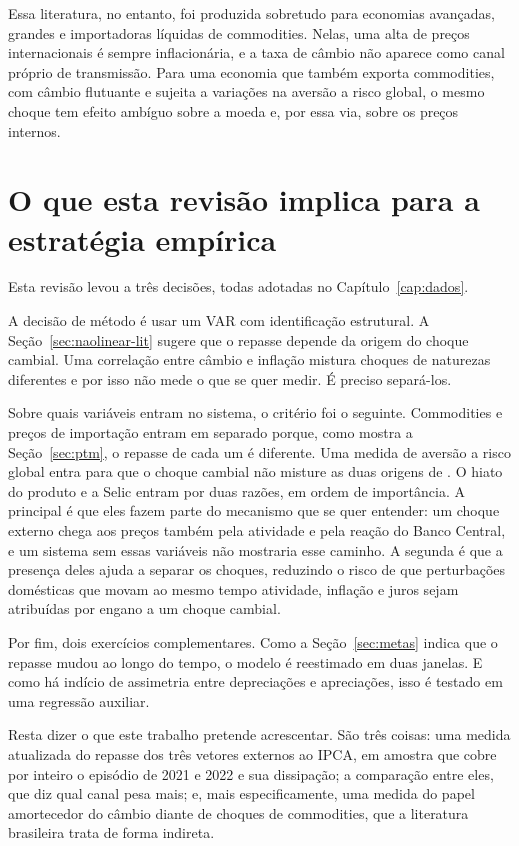 \documentclass[12pt,openright,oneside,a4paper,portuguese,brazil]{abntex2}
\begin{document}
Essa literatura, no entanto, foi produzida sobretudo para economias avançadas,
grandes e importadoras líquidas de commodities. Nelas, uma alta de preços internacionais é sempre inflacionária, e a taxa de
câmbio não aparece como canal próprio de transmissão. Para uma economia que também exporta
commodities, com câmbio flutuante e sujeita a variações na aversão a risco
global, o mesmo choque tem efeito ambíguo sobre a moeda e, por essa via, sobre
os preços internos.

\section{O que esta revisão implica para a estratégia empírica}
\label{sec:implicacoes}

Esta revisão levou a três decisões, todas adotadas no
Capítulo~\ref{cap:dados}.

A decisão de método é usar um VAR com identificação estrutural. A Seção~\ref{sec:naolinear-lit} sugere que o repasse depende da origem do
choque cambial. Uma correlação entre câmbio e inflação mistura choques de naturezas
diferentes e por isso não mede o que se quer medir. É preciso separá-los.

Sobre quais variáveis entram no sistema, o critério foi o seguinte. Commodities e preços de
importação entram em separado porque, como mostra a Seção~\ref{sec:ptm}, o
repasse de cada um é diferente. Uma medida de aversão a risco global entra para
que o choque cambial não misture as duas origens de . O hiato do produto e a Selic entram por duas razões, em ordem de importância.
A principal é que eles fazem parte do mecanismo que se quer entender: um
choque externo chega aos preços também pela atividade e pela reação do Banco
Central, e um sistema sem essas variáveis não mostraria esse caminho. A
segunda é que a presença deles ajuda a separar os choques, reduzindo o risco
de que perturbações domésticas que movam ao mesmo tempo atividade, inflação e
juros sejam atribuídas por engano a um choque cambial.

Por fim, dois exercícios complementares. Como a
Seção~\ref{sec:metas} indica que o repasse mudou ao longo do tempo, o modelo é
reestimado em duas janelas. E como há indício de assimetria entre depreciações e
apreciações, isso é testado em uma regressão auxiliar.

Resta dizer o que este trabalho pretende acrescentar. São três coisas: uma
medida atualizada do repasse dos três vetores externos ao IPCA, em amostra que
cobre por inteiro o episódio de 2021 e 2022 e sua dissipação; a comparação
entre eles, que diz qual canal pesa mais; e, mais especificamente, uma medida
do papel amortecedor do câmbio diante de choques de commodities, que a
literatura brasileira trata de forma indireta.
\end{document}
